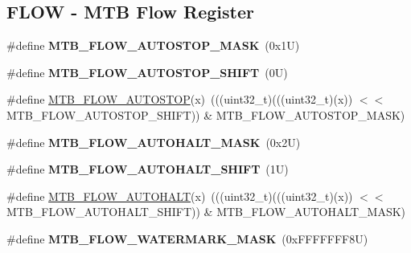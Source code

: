 \subsection*{F\+L\+OW -\/ M\+TB Flow Register}
\begin{DoxyCompactItemize}
\item 
\mbox{\label{group___m_t_b___register___masks_ga9a44f1be981682cb9519f33e95b94644}} 
\#define {\bfseries M\+T\+B\+\_\+\+F\+L\+O\+W\+\_\+\+A\+U\+T\+O\+S\+T\+O\+P\+\_\+\+M\+A\+SK}~(0x1\+U)
\item 
\mbox{\label{group___m_t_b___register___masks_gacd0f126527ae40477d013b771e5103ee}} 
\#define {\bfseries M\+T\+B\+\_\+\+F\+L\+O\+W\+\_\+\+A\+U\+T\+O\+S\+T\+O\+P\+\_\+\+S\+H\+I\+FT}~(0\+U)
\item 
\#define \mbox{\hyperlink{group___m_t_b___register___masks_ga6d51db1ab5a421c90ef4bebf27447f45}{M\+T\+B\+\_\+\+F\+L\+O\+W\+\_\+\+A\+U\+T\+O\+S\+T\+OP}}(x)~(((uint32\+\_\+t)(((uint32\+\_\+t)(x)) $<$$<$ M\+T\+B\+\_\+\+F\+L\+O\+W\+\_\+\+A\+U\+T\+O\+S\+T\+O\+P\+\_\+\+S\+H\+I\+FT)) \& M\+T\+B\+\_\+\+F\+L\+O\+W\+\_\+\+A\+U\+T\+O\+S\+T\+O\+P\+\_\+\+M\+A\+SK)
\item 
\mbox{\label{group___m_t_b___register___masks_ga6be5a7f0961e0862f4d2d270f0524a51}} 
\#define {\bfseries M\+T\+B\+\_\+\+F\+L\+O\+W\+\_\+\+A\+U\+T\+O\+H\+A\+L\+T\+\_\+\+M\+A\+SK}~(0x2\+U)
\item 
\mbox{\label{group___m_t_b___register___masks_ga6791ae220dbaca3c5866b664c56c0b56}} 
\#define {\bfseries M\+T\+B\+\_\+\+F\+L\+O\+W\+\_\+\+A\+U\+T\+O\+H\+A\+L\+T\+\_\+\+S\+H\+I\+FT}~(1\+U)
\item 
\#define \mbox{\hyperlink{group___m_t_b___register___masks_gae3bdefd546e68068d63078e8c4a73a4a}{M\+T\+B\+\_\+\+F\+L\+O\+W\+\_\+\+A\+U\+T\+O\+H\+A\+LT}}(x)~(((uint32\+\_\+t)(((uint32\+\_\+t)(x)) $<$$<$ M\+T\+B\+\_\+\+F\+L\+O\+W\+\_\+\+A\+U\+T\+O\+H\+A\+L\+T\+\_\+\+S\+H\+I\+FT)) \& M\+T\+B\+\_\+\+F\+L\+O\+W\+\_\+\+A\+U\+T\+O\+H\+A\+L\+T\+\_\+\+M\+A\+SK)
\item 
\mbox{\label{group___m_t_b___register___masks_ga381f94c6e6980a65bb9fbc594dd688bd}} 
\#define {\bfseries M\+T\+B\+\_\+\+F\+L\+O\+W\+\_\+\+W\+A\+T\+E\+R\+M\+A\+R\+K\+\_\+\+M\+A\+SK}~(0x\+F\+F\+F\+F\+F\+F\+F8\+U)

\end{DoxyCompactItemize}
